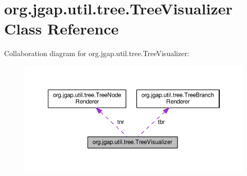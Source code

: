 \hypertarget{classorg_1_1jgap_1_1util_1_1tree_1_1_tree_visualizer}{\section{org.\-jgap.\-util.\-tree.\-Tree\-Visualizer Class Reference}
\label{classorg_1_1jgap_1_1util_1_1tree_1_1_tree_visualizer}
}


Collaboration diagram for org.\-jgap.\-util.\-tree.\-Tree\-Visualizer\-:
\nopagebreak
\begin{figure}[H]
\begin{center}
\leavevmode
\includegraphics[width=350pt]{classorg_1_1jgap_1_1util_1_1tree_1_1_tree_visualizer__coll__graph}
\end{center}
\end{figure}
